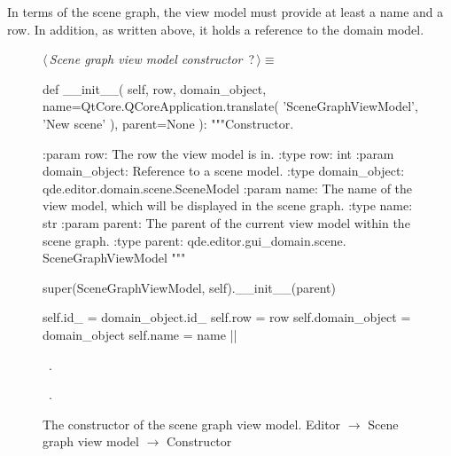 \documentclass[%
    a4paper,    %
    justified,  %
    nobib,      %
    openany     %
]{tufte-book}
\begin{document}
In terms of the scene graph, the view model must provide at least a name and a
row. In addition, as written above, it holds a reference to the domain model.

\begin{figure}
\begin{flushleft} \small
\begin{minipage}{\linewidth}\label{scrap24}\raggedright\small
{} $\langle\,${\itshape Scene graph view model constructor}\nobreak\ {\footnotesize {?}}$\,\rangle\equiv$
\vspace{-1ex}
\begin{pythoncode}
def __init__(
        self,
        row,
        domain_object,
        name=QtCore.QCoreApplication.translate(
            'SceneGraphViewModel', 'New scene'
        ),
        parent=None
):
    """Constructor.

    :param row:           The row the view model is in.
    :type  row:           int
    :param domain_object: Reference to a scene model.
    :type  domain_object: qde.editor.domain.scene.SceneModel
    :param name:          The name of the view model, which will
                          be displayed in the scene graph.
    :type  name:          str
    :param parent:        The parent of the current view model
                          within the scene graph.
    :type parent:         qde.editor.gui_domain.scene.
                          SceneGraphViewModel
    """

    super(SceneGraphViewModel, self).__init__(parent)

    self.id_ = domain_object.id_
    self.row  = row
    self.domain_object = domain_object
    self.name = name
|\NWsep|
\end{pythoncode}
\vspace{1.5ex}
\footnotesize
\begin{list}{}{\setlength{\itemsep}{-\parsep}\setlength{\itemindent}{-\leftmargin}}
\item \NWtxtMacroDefBy\ .
\item \NWtxtMacroRefIn\ .

\item{}
\end{list}
\end{minipage}\vspace{4ex}
\end{flushleft}
\caption{The constructor of the scene graph view model.
  \newline{}\newline{}Editor $\rightarrow$ Scene graph view model $\rightarrow$
  Constructor}
\label{editor:lst:scene-graph-view-model:constructor}
\end{figure}
\end{document}
